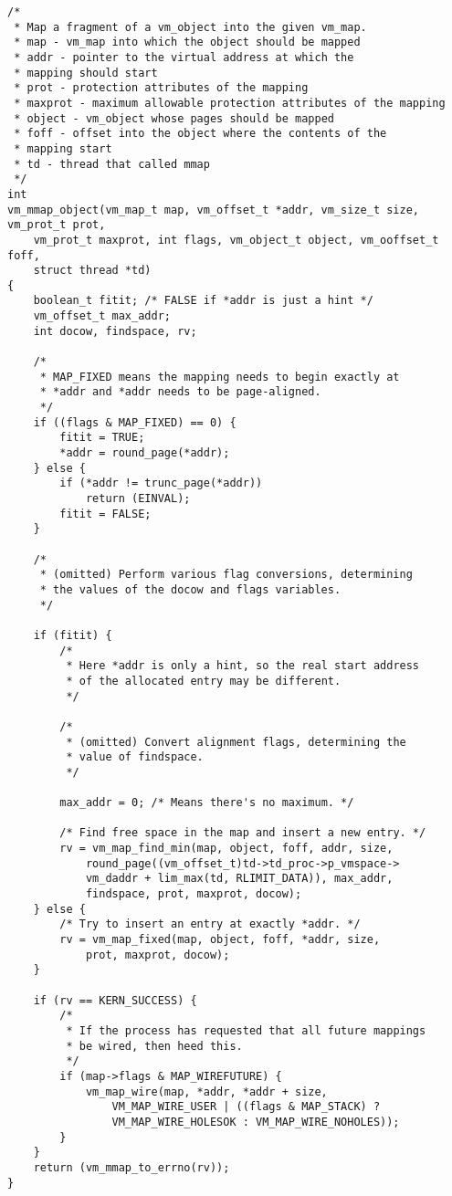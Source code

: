 \documentclass[shortabstract, english]{iithesis}
\newenvironment{code}{}{}
\begin{document}
\begin{code}
\begin{verbatim}
/*
 * Map a fragment of a vm_object into the given vm_map.
 * map - vm_map into which the object should be mapped
 * addr - pointer to the virtual address at which the
 * mapping should start
 * prot - protection attributes of the mapping
 * maxprot - maximum allowable protection attributes of the mapping
 * object - vm_object whose pages should be mapped
 * foff - offset into the object where the contents of the
 * mapping start
 * td - thread that called mmap
 */
int
vm_mmap_object(vm_map_t map, vm_offset_t *addr, vm_size_t size, vm_prot_t prot,
    vm_prot_t maxprot, int flags, vm_object_t object, vm_ooffset_t foff,
    struct thread *td)
{
    boolean_t fitit; /* FALSE if *addr is just a hint */
    vm_offset_t max_addr;
    int docow, findspace, rv;

    /*
     * MAP_FIXED means the mapping needs to begin exactly at
     * *addr and *addr needs to be page-aligned.
     */
    if ((flags & MAP_FIXED) == 0) {
        fitit = TRUE;
        *addr = round_page(*addr);
    } else {
        if (*addr != trunc_page(*addr))
            return (EINVAL);
        fitit = FALSE;
    }

    /*
     * (omitted) Perform various flag conversions, determining
     * the values of the docow and flags variables.
     */

    if (fitit) {
        /*
         * Here *addr is only a hint, so the real start address
         * of the allocated entry may be different.
         */

        /*
         * (omitted) Convert alignment flags, determining the
         * value of findspace.
         */

        max_addr = 0; /* Means there's no maximum. */

        /* Find free space in the map and insert a new entry. */
        rv = vm_map_find_min(map, object, foff, addr, size,
            round_page((vm_offset_t)td->td_proc->p_vmspace->
            vm_daddr + lim_max(td, RLIMIT_DATA)), max_addr,
            findspace, prot, maxprot, docow);
    } else {
        /* Try to insert an entry at exactly *addr. */
        rv = vm_map_fixed(map, object, foff, *addr, size,
            prot, maxprot, docow);
    }

    if (rv == KERN_SUCCESS) {
        /*
         * If the process has requested that all future mappings
         * be wired, then heed this.
         */
        if (map->flags & MAP_WIREFUTURE) {
            vm_map_wire(map, *addr, *addr + size,
                VM_MAP_WIRE_USER | ((flags & MAP_STACK) ?
                VM_MAP_WIRE_HOLESOK : VM_MAP_WIRE_NOHOLES));
        }
    }
    return (vm_mmap_to_errno(rv));
}
\end{verbatim}
\end{code}
\end{document}
